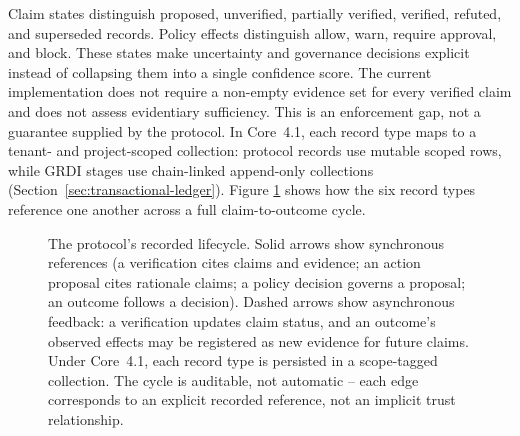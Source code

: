 \documentclass[11pt]{article}
\begin{document}
Claim states distinguish proposed, unverified, partially verified, verified,
refuted, and superseded records. Policy effects distinguish allow, warn,
require approval, and block. These states make uncertainty and governance
decisions explicit instead of collapsing them into a single confidence score.
The current implementation does not require a non-empty evidence set for every
verified claim and does not assess evidentiary sufficiency. This is an
enforcement gap, not a guarantee supplied by the protocol. In Core~4.1, each
record type maps to a tenant- and project-scoped collection: protocol records
use mutable scoped rows, while GRDI stages use chain-linked append-only
collections (Section~\ref{sec:transactional-ledger}). Figure
\ref{fig:protocol-lifecycle} shows how the six record types reference one
another across a full claim-to-outcome cycle.

\begin{figure}[H]
\centering
{}
\caption{The protocol's recorded lifecycle. Solid arrows show synchronous
references (a verification cites claims and evidence; an action proposal
cites rationale claims; a policy decision governs a proposal; an outcome
follows a decision). Dashed arrows show asynchronous feedback: a verification
updates claim status, and an outcome's observed effects may be registered as
new evidence for future claims. Under Core~4.1, each record type is persisted
in a scope-tagged collection. The cycle is auditable, not automatic --
each edge corresponds to an explicit recorded reference, not an implicit
trust relationship.}
\label{fig:protocol-lifecycle}
\end{figure}
\end{document}
